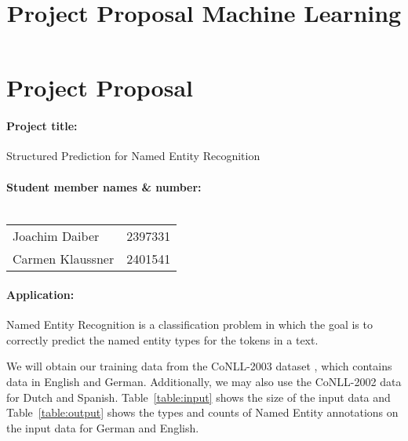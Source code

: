 \documentclass[a4paper,10pt]{article}
\title{Project Proposal Machine Learning}
\author{}
\date{}
\begin{document}
\maketitle

% 
% 


\section*{Project Proposal}

\paragraph{Project title:}
Structured Prediction for Named Entity Recognition

\paragraph{Student member names \& number:\\\\}

\begin{tabular}{l l}
Joachim Daiber   & 2397331 \\
Carmen Klaussner & 2401541\\
\end{tabular}



\paragraph{Application:}

Named Entity Recognition is a classification problem in which the goal is to correctly predict the named entity types for
the tokens in a text.


We will obtain our training data from the CoNLL-2003 dataset \cite{TjongKimSang:2003:ICS:1119176.1119195}, which contains
data in English and German. Additionally, we may also use the CoNLL-2002 data for Dutch and Spanish.  Table~\ref{table:input} shows the size of the input data and Table~\ref{table:output} shows the types and counts of Named Entity annotations on the input data for German and English.
\end{document}
